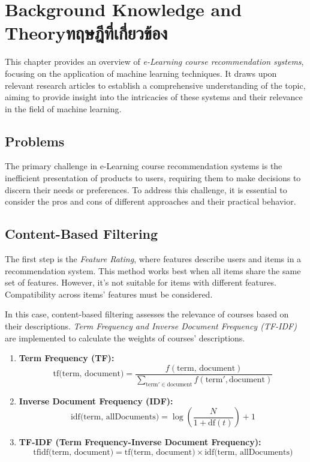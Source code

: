 \chapter{\ifenglish Background Knowledge and Theory\else ทฤษฎีที่เกี่ยวข้อง\fi}

This chapter provides an overview of \textit{e-Learning course recommendation systems}, focusing on 
the application of machine learning techniques. It draws upon relevant research articles 
to establish a comprehensive understanding of the topic, aiming to provide insight into 
the intricacies of these systems and their relevance in the field of machine learning.

\section{Problems}

The primary challenge in e-Learning course recommendation systems is the inefficient presentation 
of products to users, requiring them to make decisions to discern their needs or preferences. 
To address this challenge, it is essential to consider the pros and cons of different approaches 
and their practical behavior.

\section{Content-Based Filtering}

The first step is the \textit{Feature Rating}, where features describe users and items in a 
recommendation system. This method works best when all items share the same set of features. 
However, it's not suitable for items with different features. Compatibility across items' features 
must be considered.

In this case, content-based filtering assesses the relevance of courses based on their descriptions. 
\textit{Term Frequency and Inverse Document Frequency (TF-IDF)} are implemented to calculate the weights of 
courses' descriptions.

\begin{enumerate}
  \item \textbf{Term Frequency (TF):}
  \begin{equation}
    \text{tf(term, document)} = \frac{f(\text{term, document})}{\sum_{\text{term}' \in \text{document}} f(\text{term}', \text{document})}
  \end{equation}
  \item \textbf{Inverse Document Frequency (IDF):}
  \begin{equation}
    \text{idf(term, allDocuments)} = \log \left( \frac{N}{1 + \text{df}(t)} \right) + 1
  \end{equation}
  \item \textbf{TF-IDF (Term Frequency-Inverse Document Frequency):}
  \begin{equation}
    \text{tfidf(term, document)} = \text{tf(term, document)} \times \text{idf(term, allDocuments)}
  \end{equation}
\end{enumerate}

